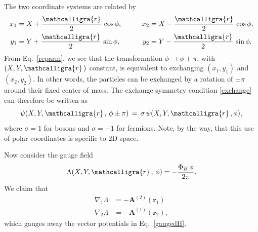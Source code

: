 \documentclass[pra,12pt]{revtex4}
\begin{document}
\noindent
The two coordinate systems are related by
\begin{align}
  \begin{aligned}
    x_1 &= X + \frac{\mathcalligra{r}}{2} \,\cos\phi, \qquad
    & x_2 &= X - \frac{\mathcalligra{r}}{2} \,\cos\phi, \\
    y_1 &= Y + \frac{\mathcalligra{r}}{2} \,\sin\phi,
    & y_2 &= Y - \frac{\mathcalligra{r}}{2} \,\sin\phi.
  \end{aligned}
  \label{reparm}
\end{align}
From Eq.~\eqref{reparm}, we see that the transformation $\phi
\rightarrow \phi \pm \pi$, with $(X, Y, \mathcalligra{r}\,)$ constant,
is equivalent to exchanging $(x_1,y_1)$ and $(x_2,y_2)$.  In other
words, the particles can be exchanged by a rotation of $\pm \pi$
around their fixed center of mass.  The exchange symmetry condition
\eqref{exchange} can therefore be written as
\begin{equation}
  \psi(X, Y, \mathcalligra{r}\,,\, \phi \pm \pi) \,=\, \sigma \, \psi(X,
  Y, \mathcalligra{r}\,, \phi),
  \label{exchange2}
\end{equation}
where $\sigma = 1$ for bosons and $\sigma = -1$ for fermions.  Note,
by the way, that this use of polar coordinates is specific to 2D
space.

Now consider the gauge field
\begin{equation}
  \Lambda(X, Y, \mathcalligra{r}\,,\, \phi) = -\frac{\Phi_B \,\phi}{2\pi}.
  \label{Lambda}
\end{equation}
We claim that
\begin{align}
  \nabla_1 \Lambda &= - \mathbf{A}^{(2)}(\mathbf{r}_1) \label{nabla1} \\
  \nabla_2 \Lambda &= - \mathbf{A}^{(1)}(\mathbf{r}_2), \label{nabla2}
\end{align}
which gauges away the vector potentials in Eq.~\eqref{gaugedH}.
\end{document}
